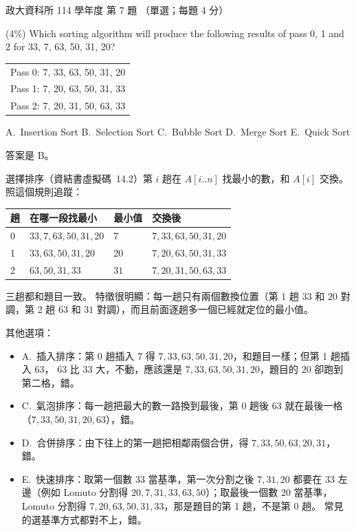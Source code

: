 \begin{pastexam}[label={px:nccu-114-dsa-07}]{政大資科所 114 學年度 第 7 題}
（單選；每題 4 分）

(4\%) Which sorting algorithm will produce the following results of pass 0, 1 and 2 for 33, 7, 63,
50, 31, 20?
\begin{center}
\begin{tabular}{l}
Pass 0: 7, 33, 63, 50, 31, 20\\
Pass 1: 7, 20, 63, 50, 31, 33\\
Pass 2: 7, 20, 31, 50, 63, 33
\end{tabular}
\end{center}
A.~Insertion Sort \qquad B.~Selection Sort \qquad C.~Bubble Sort \qquad D.~Merge Sort \qquad
E.~Quick Sort
\end{pastexam}

\begin{pastsoln}
答案是 B。

選擇排序（資結書虛擬碼~14.2）第 $i$ 趟在 $A[i..n]$ 找最小的數，和 $A[i]$ 交換。 照這個規則追蹤：
\begin{center}
\begin{tabular}{llll}
\toprule
趟 & 在哪一段找最小 & 最小值 & 交換後 \\
\midrule
0 & $33, 7, 63, 50, 31, 20$ & $7$ & $7, 33, 63, 50, 31, 20$ \\
1 & $33, 63, 50, 31, 20$ & $20$ & $7, 20, 63, 50, 31, 33$ \\
2 & $63, 50, 31, 33$ & $31$ & $7, 20, 31, 50, 63, 33$ \\
\bottomrule
\end{tabular}
\end{center}
三趟都和題目一致。 特徵很明顯：每一趟只有兩個數換位置（第 1 趟 $33$ 和 $20$ 對調，第 2 趟 $63$
和 $31$ 對調），而且前面逐趟多一個已經就定位的最小值。

其他選項：
\begin{itemize}
\item A.~插入排序：第 0 趟插入 $7$ 得 $7, 33, 63, 50, 31, 20$，和題目一樣；但第 1 趟插入 $63$，
$63$ 比 $33$ 大，不動，應該還是 $7, 33, 63, 50, 31, 20$，題目的 $20$ 卻跑到第二格，錯。
\item C.~氣泡排序：每一趟把最大的數一路換到最後，第 0 趟後 $63$ 就在最後一格
（$7, 33, 50, 31, 20, 63$），錯。
\item D.~合併排序：由下往上的第一趟把相鄰兩個合併，得 $7, 33, 50, 63, 20, 31$，錯。
\item E.~快速排序：取第一個數 $33$ 當基準，第一次分割之後 $7, 31, 20$ 都要在 $33$ 左邊（例如
Lomuto 分割得 $20, 7, 31, 33, 63, 50$）；取最後一個數 $20$ 當基準，Lomuto 分割得
$7, 20, 63, 50, 31, 33$，那是題目的第 1 趟，不是第 0 趟。 常見的選基準方式都對不上，錯。
\end{itemize}
\end{pastsoln}

